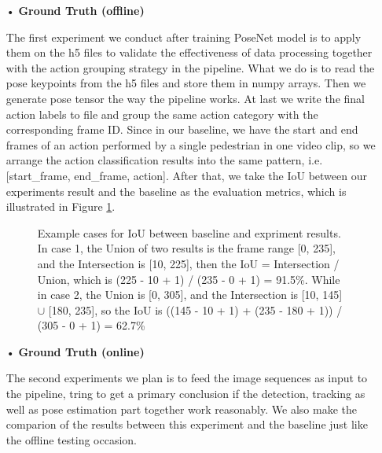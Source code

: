 \begin{itemize}
\item[•] \textbf{Ground Truth (offline)}

The first experiment we conduct after training PoseNet model is to apply them on the h5 files to validate the effectiveness of data processing together with the action grouping strategy in the pipeline. What we do is to read the pose keypoints from the h5 files and store them in numpy arrays. Then we generate pose tensor the way the pipeline works. At last we write the final action labels to file and group the same action category with the corresponding frame ID. Since in our baseline, we have the start and end frames of an action performed by a single pedestrian in one video clip, so we arrange the action classification results into the same pattern, i.e. [start\_frame, end\_frame, action]. After that, we take the IoU between our experiments result and the baseline as the evaluation metrics, which is illustrated in Figure \ref{fig:iou_case}.

\begin{figure}[H]
  \centering
  \caption{Example cases for IoU between baseline and expriment results. In case 1, the Union of two results is the frame range [0,
           235], and the Intersection is [10, 225], then the IoU = Intersection / Union, which is (225 - 10 + 1) / (235 - 0 + 1) =
           91.5\%. While in case 2, the Union is [0, 305], and the Intersection is [10, 145] $\cup$ [180, 235], so the IoU is ((145
           - 10 + 1) + (235 - 180 + 1)) / (305 - 0 + 1) = 62.7\%}
  \label{fig:iou_case}
\end{figure} 

\item[•] \textbf{Ground Truth (online)}

The second experiments we plan is to feed the image sequences as input to the pipeline, tring to get a primary conclusion if the detection, tracking as well as pose estimation part together work reasonably. We also make the comparion of the results between this experiment and the baseline just like the offline testing occasion.


\end{itemize}
